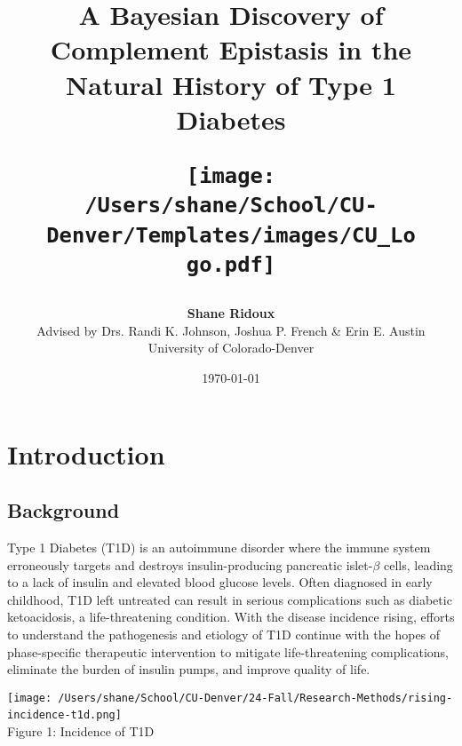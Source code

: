 \documentclass{article}\usepackage[]{graphicx}\usepackage[]{color}
\begin{document}
\title{\bf A Bayesian Discovery of Complement Epistasis in the Natural History of Type 1 Diabetes
\vspace{2.5cm}\\
\begin{figure}[h!]
\centering \texttt{[image: /Users/shane/School/CU-Denver/Templates/images/CU\_Logo.pdf]}
\end{figure}
}
\author{{\bf \huge Shane Ridoux} \\
Advised by Drs. Randi K. Johnson, Joshua P. French \& Erin E. Austin\\
University of Colorado-Denver}

\date{\today} 



 \linespread{2}

 \maketitle
\newpage
\tableofcontents
\newpage


\doublespacing
\section{Introduction}
\subsection{Background}
Type 1 Diabetes (T1D) is an autoimmune disorder where the immune system erroneously targets and destroys insulin-producing pancreatic islet-$\beta$ cells, leading to a lack of insulin and elevated blood glucose levels. Often diagnosed in early childhood, T1D left untreated can result in serious complications such as diabetic ketoacidosis, a life-threatening condition. With the disease incidence rising, efforts to understand the pathogenesis and etiology of T1D continue with the hopes of phase-specific therapeutic intervention to mitigate life-threatening complications, eliminate the burden of insulin pumps, and improve quality of life.

\texttt{[image: /Users/shane/School/CU-Denver/24-Fall/Research-Methods/rising-incidence-t1d.png]}{\\ \tiny Figure 1: Incidence of T1D}  
\end{document}
